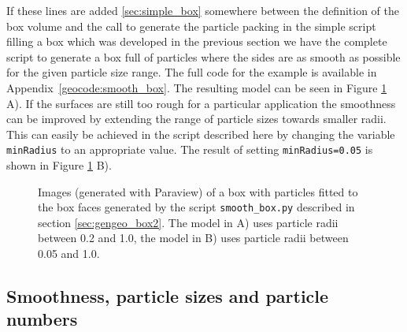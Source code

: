 If these lines are added \ref{sec:simple_box} somewhere between the definition of the box volume and the call to generate the particle packing in the simple script filling a box which was developed in the previous section we have the complete script to generate a box full of particles where the sides are as smooth as possible for the given particle size range. The full code for the example is available in Appendix~\ref{geocode:smooth_box}. The resulting model can be seen in Figure \ref{fig:smooth_box} A). If the surfaces are still too rough for a particular application the smoothness can be improved by extending the range of particle sizes towards smaller radii. This can easily be achieved in the script described here by changing the variable \texttt{minRadius} to an appropriate value. The result of setting  \texttt{minRadius=0.05} is shown in Figure \ref{fig:smooth_box} B). \par	

\begin{figure}
\begin{center}
\end{center}
\caption{Images (generated with Paraview) of a box with particles fitted to the box faces generated by the script \texttt{smooth\_box.py} described in section \ref{sec:gengeo_box2}. The model in A) uses particle radii between 0.2 and 1.0, the model in B) uses particle radii between 0.05 and 1.0.} \label{fig:smooth_box}
\end{figure}

\subsection{Smoothness, particle sizes and particle numbers}

